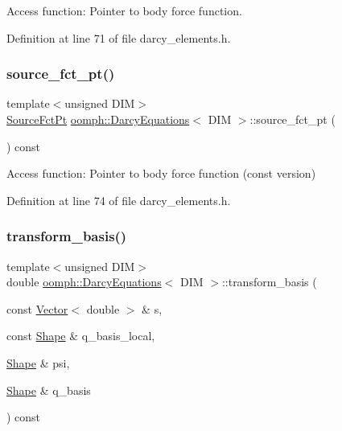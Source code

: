 Access function\+: Pointer to body force function. 



Definition at line 71 of file darcy\+\_\+elements.\+h.

\mbox{\label{classoomph_1_1DarcyEquations_a670893e19f2ac6f7f02f0d5b03ca0b16}} 
\subsubsection{\texorpdfstring{source\+\_\+fct\+\_\+pt()}{source\_fct\_pt()}\hspace{0.1cm}{\footnotesize\ttfamily [2/2]}}
{\footnotesize\ttfamily template$<$unsigned D\+IM$>$ \\
\hyperlink{classoomph_1_1DarcyEquations_adcf88d9573b0f1c1988bdae6234eb7f8}{Source\+Fct\+Pt} \hyperlink{classoomph_1_1DarcyEquations}{oomph\+::\+Darcy\+Equations}$<$ D\+IM $>$\+::source\+\_\+fct\+\_\+pt (\begin{DoxyParamCaption}{ }\end{DoxyParamCaption}) const\hspace{0.3cm}{\ttfamily [inline]}}



Access function\+: Pointer to body force function (const version) 



Definition at line 74 of file darcy\+\_\+elements.\+h.

\mbox{\label{classoomph_1_1DarcyEquations_a7baf04e00b11ce49b04ff78022b5e382}} 
\subsubsection{\texorpdfstring{transform\+\_\+basis()}{transform\_basis()}}
{\footnotesize\ttfamily template$<$unsigned D\+IM$>$ \\
double \hyperlink{classoomph_1_1DarcyEquations}{oomph\+::\+Darcy\+Equations}$<$ D\+IM $>$\+::transform\+\_\+basis (\begin{DoxyParamCaption}\item[{const \hyperlink{classoomph_1_1Vector}{Vector}$<$ double $>$ \&}]{s,  }\item[{const \hyperlink{classoomph_1_1Shape}{Shape} \&}]{q\+\_\+basis\+\_\+local,  }\item[{\hyperlink{classoomph_1_1Shape}{Shape} \&}]{psi,  }\item[{\hyperlink{classoomph_1_1Shape}{Shape} \&}]{q\+\_\+basis }\end{DoxyParamCaption}) const}



